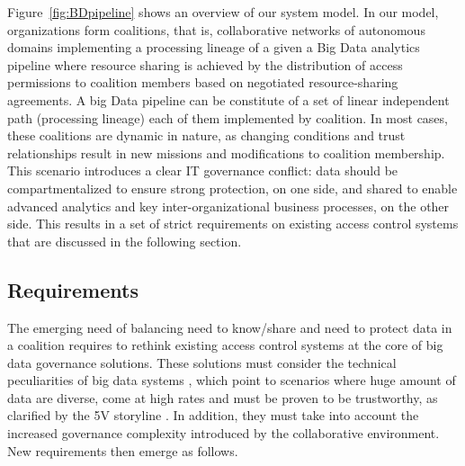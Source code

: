 Figure~\ref{fig:BDpipeline} shows an overview of our system model.
In our model, organizations form coalitions, that is, collaborative networks of autonomous domains implementing a processing lineage of a given a Big Data analytics pipeline where resource sharing is achieved by the distribution of access permissions to coalition members based on negotiated resource-sharing agreements. A big Data pipeline can be constitute of a set of linear independent path (processing lineage) each of them implemented by coalition. In most cases, these coalitions are dynamic in nature, as changing conditions and trust relationships result in new missions and modifications to coalition membership. This scenario introduces a clear IT governance conflict: data should be compartmentalized to ensure strong protection, on one side, and shared to enable advanced analytics and key inter-organizational business processes, on the other side. This results in a set of strict requirements on existing access control systems that are discussed in the following section.


\subsection{Requirements}\label{sec:accesscontrol_req}
The emerging need of balancing need to know/share and need to protect data in a coalition requires to rethink existing access control systems at the core of big data governance solutions. These solutions must consider the technical peculiarities of big data systems \cite{al2018exploring,aissa2020decide}, which point to scenarios where huge amount of data are diverse, come at high rates and must be proven to be trustworthy, as clarified by the 5V storyline \cite{5v}. In addition, they must take into account the increased governance complexity introduced by the collaborative environment. New  requirements then emerge as follows.

